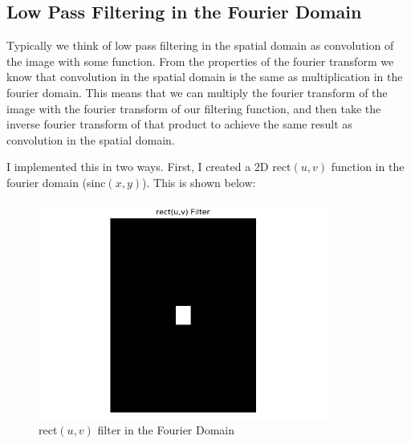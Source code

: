 \documentclass[]{article}
\begin{document}
%	
%	
%	
%	
%	
	\subsection{Low Pass Filtering in the Fourier Domain}
		Typically we think of low pass filtering in the spatial domain as convolution of the image with some function. From the properties of the fourier transform we know that convolution in the spatial domain is the same as multiplication in the fourier domain. This means that we can multiply the fourier transform of the image with the fourier transform of our filtering function, and then take the inverse  fourier transform of that product to achieve the same result as convolution in the spatial domain. 
	
	I implemented this in two ways. First, I created a 2D rect$(u,v)$ function in the fourier domain (sinc$(x,y)$). This is shown below:
	
	\begin{figure}[H]
		\centering
		\includegraphics[width=3.75in]{p1_output/rect_filter.png}
		\caption{rect$(u,v)$ filter in the Fourier Domain}
	\end{figure}
	
\end{document}
